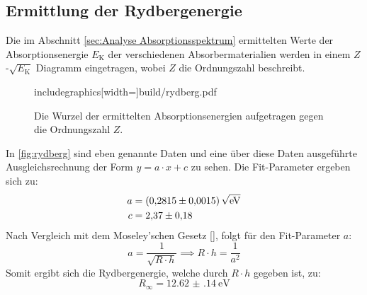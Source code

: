 \subsection{Ermittlung der Rydbergenergie}

Die im Abschnitt \ref{sec:Analyse Absorptionsspektrum} ermittelten Werte der Absorptionsenergie $E_{\text{K}}$ der verschiedenen Absorbermaterialien werden
in  einem $Z$-$\sqrt{E_{\text{K}}}$ Diagramm eingetragen, wobei $Z$ die Ordnungszahl beschreibt.

\begin{figure}
  \centering
  includegraphics[width=\textwidth]{build/rydberg.pdf}
  \caption{Die Wurzel der ermittelten Absorptionsenergien aufgetragen gegen die Ordnungszahl $Z$.}
  \label{fig:rydberg}
\end{figure}

\noindent
In \autoref{fig:rydberg} sind eben genannte Daten und eine über diese Daten ausgeführte Ausgleichsrechnung der Form $y = a \cdot x + c $ zu sehen.
Die Fit-Parameter ergeben sich zu:
\begin{align*}
  a &= \SI{0.2815 \pm 0.0015}{\per\sqrt{\electronvolt}}\\
  c &= \num{2.37 \pm 0.18}
\end{align*}
Nach Vergleich mit dem Moseley'schen Gesetz \eqref{}, folgt für den Fit-Parameter $a$:
\begin{equation*}
  a = \frac{1}{\sqrt{R\cdot h}} \implies R \cdot h = \frac{1}{a^2}
\end{equation*}
Somit ergibt sich die Rydbergenergie, welche durch $R \cdot h $ gegeben ist, zu:
\begin{equation*}
  R_{\infty} = \SI{12.62(14)}{\electronvolt}
\end{equation*}